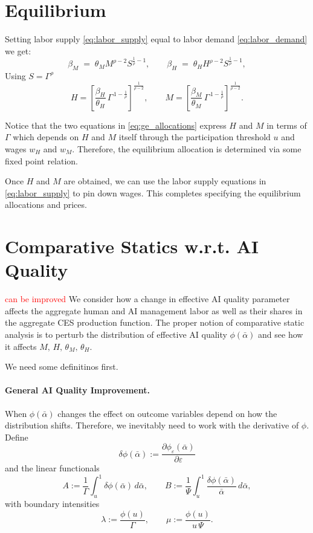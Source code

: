 \documentclass[english]{article}
\begin{document}
\section*{Equilibrium}
Setting labor supply \eqref{eq:labor_supply} equal to labor demand \eqref{eq:labor_demand} we get:
\begin{equation}
\beta_M \;=\; \theta_M M^{\rho-2} S^{\frac{1}{\rho}-1},
\qquad
\beta_H \;=\; \theta_H H^{\rho-2} S^{\frac{1}{\rho}-1}, \label{eq:labor_demand_supply}
\end{equation}
Using $S=\Gamma^\rho$
\begin{equation}
H
= \left[ \frac{\beta_H}{\theta_H}\,\Gamma^{\,1-\frac{1}{\rho}} \right]^{\frac{1}{\rho-2}},
\qquad
M
= \left[ \frac{\beta_M}{\theta_M}\,\Gamma^{\,1-\frac{1}{\rho}} \right]^{\frac{1}{\rho-2}}. \label{eq:ge_allocations}
\end{equation}

Notice that the two equations in \eqref{eq:ge_allocations} express $H$ and $M$ in terms of $\Gamma$ which depends on $H$ and $M$ itself through the participation threshold $u$ and wages $w_H$ and $w_M$.
Therefore, the equilibrium allocation is determined via some fixed point relation.

Once $H$ and $M$ are obtained, we can use the labor supply equations in \eqref{eq:labor_supply} to pin down wages.
This completes specifying the equilibrium allocations and prices.


\section*{Comparative Statics w.r.t. AI Quality}

\textcolor{red}{can be improved}
We consider how a change in effective AI quality parameter affects the aggregate human and AI management labor as well as their shares in the aggregate CES production function.
The proper notion of comparative static analysis is to perturb the distribution of effective AI quality $\phi(\bar{\alpha})$ and see how it affects $M,\,H,\,\theta_M,\,\theta_H$.

We need some definitinos first. 

\paragraph{General AI Quality Improvement.}
When $\phi(\bar{\alpha})$ changes the effect on outcome variables depend on how the distribution shifts.
Therefore, we inevitably need to work with the derivative of $\phi$. 
Define
\[
\delta\phi(\bar{\alpha}):= \frac{\partial \phi_\varepsilon(\bar{\alpha})}{\partial \varepsilon }
\]
and the linear functionals
\[
A:=\frac{1}{\Gamma}\int_u^{1}\delta\phi(\bar{\alpha})\,d\bar{\alpha},
\qquad
B:=\frac{1}{\Psi}\int_u^{1}\frac{\delta\phi(\bar{\alpha})}{\bar{\alpha}}\,d\bar{\alpha},
\]
with boundary intensities
\[
\lambda:=\frac{\phi(u)}{\Gamma},
\qquad 
\mu:=\frac{\phi(u)}{u\,\Psi}.
\]
\end{document}
